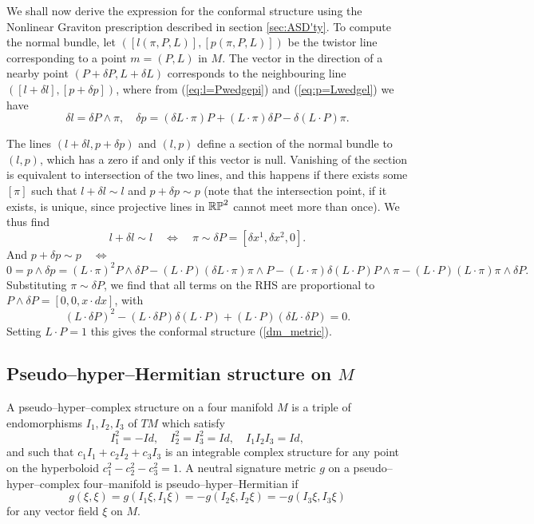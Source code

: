 We shall now derive the expression for the conformal structure using the Nonlinear Graviton prescription described in section \ref{sec:ASD'ty}. To compute the normal bundle, let $([l(\pi, P, L)], 
[p(\pi, P, L)])$
be the twistor line corresponding to a point $m=(P, L)$ in $M$. The vector in the direction of a nearby point $(P+\delta P,L+\delta L)$ corresponds to the neighbouring line $([l+\delta l], [p+\delta p])$, where from (\ref{eq:l=Pwedgepi}) and (\ref{eq:p=Lwedgel}) we have
\[
\delta l=\delta P\wedge \pi, \quad
\delta p= (\delta L\cdot \pi)P+(L\cdot\pi) \delta P-\delta (L\cdot P)\pi.
\]

The lines  $(l+\delta l, p+\delta p)$  and $(l, p)$ define a section of the normal bundle to $(l,p)$, which has a zero if and only if this vector is null. Vanishing of the section is equivalent to intersection of the two lines, and this happens if there exists some $[\pi]$ such that $l+\delta l\sim l$ and $p+\delta p\sim p$ (note that the intersection point, if it exists, is unique, since projective lines in $\mathbb{RP}^2$ cannot meet more than once). We thus find
\[
l+\delta l\sim l \quad \iff \quad\pi\sim\delta P=[\delta x^1, \delta x^2, 0].
\]
And $p+\delta p\sim p \quad \iff$
\[
0=p\wedge \delta p=(L\cdot \pi)^2P\wedge \delta P-(L\cdot P)
(\delta L\cdot \pi)\pi\wedge P-(L\cdot \pi)\delta (L\cdot P)P\wedge \pi-
(L\cdot P)(L\cdot \pi) \pi\wedge \delta P.
\]
Substituting $\pi\sim\delta P$, we find that all terms on the RHS are proportional to $P\wedge \delta P=[0, 0, x\cdot dx]$, with
\[
(L\cdot \delta P)^2-(L\cdot \delta P)\delta(L\cdot P)+(L\cdot P)(\delta L\cdot \delta P)=0.
\]
Setting $L\cdot P=1$ this gives the conformal structure 
(\ref{dm_metric}).
\subsection{Pseudo--hyper--Hermitian structure on $M$}
A pseudo--hyper--complex structure on a four manifold $M$ is a triple of endomorphisms
$I_1, I_2, I_3$ of $TM$ which satisfy
\[
I_1^2=-Id, \quad I_2^2=I_3^2=Id, \quad I_1I_2I_3=Id,
\]
and such that $c_1I_1+c_2I_2+c_3I_3$ is an integrable complex structure for any point 
on the hyperboloid $c_1^2-c_2^2-c_3^2=1$.
A neutral signature metric $g$ on a pseudo--hyper--complex four--manifold is pseudo--hyper--Hermitian
if
\[
g(\xi, \xi)=g(I_1\xi, I_1\xi)=-g(I_2\xi, I_2\xi)=-g(I_3\xi, I_3\xi)
\]
for any vector field $\xi$ on $M$.

